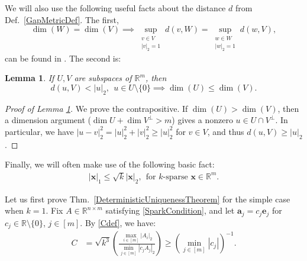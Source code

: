 \documentclass[journal, twocolumn]{IEEEtran}
\newtheorem{lemma}{Lemma}
\begin{document}
We will also use the following useful facts about the distance $d$ from Def.~\ref{GapMetricDef}. The first, 
\begin{equation}\label{SubspaceMetricSameDim}
\dim(W) = \dim(V) \implies \sup_{\substack{v \in V \\ |v|_2 = 1}}  d(v,W)  = \sup_{\substack{w \in W \\ |w|_2 = 1}} d(w,V),
\end{equation}
can be found in \cite[Lem.~3.3]{Morris10}. The second is:
\begin{lemma}\label{MinDimLemma}
If $U, V$ are subspaces of $\mathbb{R}^{m}$, then
\begin{equation*}
d(u,V) < |u|_2, \ \ u \in U \setminus{\{0\}} \implies \dim(U) \leq \dim(V).
\end{equation*}
\end{lemma}
\begin{proof}[Proof of Lemma \ref{MinDimLemma}]
We prove the contrapositive.  If $\dim(U) > \dim(V)$, then a dimension argument ($\dim U + \dim V^\perp > m$) gives a nonzero $u \in U \cap V^\perp$.  In particular, we have $|u - v|_2^2 = |u|_2^2 + |v|_2^2 \geq |u|_2^2$ for $v \in V$, and thus $d(u,V) \geq |u|_2$.
\end{proof}

Finally, we will often make use of the following basic fact:
\begin{align}\label{sqrtk}
|\mathbf{x}|_1 \leq \sqrt{k} |\mathbf{x}|_2, \ \ \text{for $k$-sparse $\mathbf{x} \in \mathbb{R}^m$}.
\end{align}

Let us first prove Thm.~\ref{DeterministicUniquenessTheorem} for the simple case when $k=1$. Fix $A \in \mathbb{R}^{n \times m}$ satisfying \eqref{SparkCondition}, and let $\mathbf{a}_j = c_j \mathbf{e}_j$ for $c_j \in \mathbb{R} \setminus \{0\}$, $j \in [m]$. By \eqref{Cdef}, we have:
\begin{align}\label{C1}
C 
&= \sqrt{k^3} \left( \frac{\max_{i \in [m]} |A_i|_2}{\min_{j \in [m]}|c_jA_j|_2} \right)
\geq \left( \min_{j \in [m]} |c_j| \right)^{-1}.
\end{align}
\end{document}
